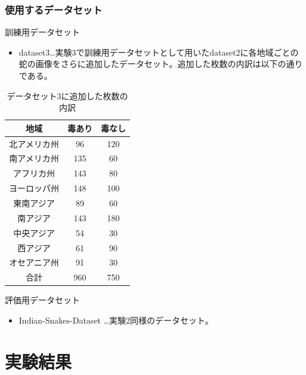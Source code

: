 \documentclass[a4paper, 11pt, titlepage]{jsarticle}
\begin{document}
\subsubsection{使用するデータセット}
訓練用データセット
\begin{itemize}
\item dataset3…実験3で訓練用データセットとして用いたdataset2に各地域ごとの蛇の画像をさらに追加したデータセット。追加した枚数の内訳は以下の通りである。
\clearpage

\end{itemize}\par
\begin{table}[htb]
\centering
  \caption{データセット3に追加した枚数の内訳}
  \begin{tabular}{|c|c|c|}  \hline
    地域 & 毒あり & 毒なし \\ \hline \hline
    北アメリカ州 & 96 & 120 \\ \hline
    南アメリカ州 & 135 & 60 \\ \hline
    アフリカ州 & 143 & 80 \\ \hline
    ヨーロッパ州 & 148 & 100 \\ \hline
    東南アジア & 89 & 60 \\ \hline
    南アジア & 143 & 180 \\ \hline
    中央アジア & 54 & 30 \\ \hline
    西アジア & 61 & 90 \\ \hline
    オセアニア州 & 91 & 30 \\ \hline \hline
    合計 & 960 & 750 \\ \hline
  \end{tabular}
\end{table}

評価用データセット
\begin{itemize}
\item Indian-Snakes-Dataset …実験2同様のデータセット。
\end{itemize}

\section{実験結果}
\end{document}
